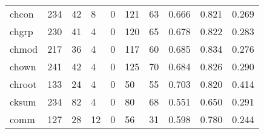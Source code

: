 \begin{longtable}{lp{2.0cm}p{2.0cm}p{2.0cm}p{2.0cm}p{2.0cm}p{2.0cm}p{2.0cm}p{2.0cm}p{2.0cm}}
chcon     &                    234 &                                 42 &                                 8 &                                0 &                               121 &                              63 &                                0.666 &                                  0.821 &                                0.269 \\
chgrp     &                    230 &                                 41 &                                 4 &                                0 &                               120 &                              65 &                                0.678 &                                  0.822 &                                0.283 \\
chmod     &                    217 &                                 36 &                                 4 &                                0 &                               117 &                              60 &                                0.685 &                                  0.834 &                                0.276 \\
chown     &                    241 &                                 42 &                                 4 &                                0 &                               125 &                              70 &                                0.684 &                                  0.826 &                                0.290 \\
chroot    &                    133 &                                 24 &                                 4 &                                0 &                                50 &                              55 &                                0.703 &                                  0.820 &                                0.414 \\
cksum     &                    234 &                                 82 &                                 4 &                                0 &                                80 &                              68 &                                0.551 &                                  0.650 &                                0.291 \\
comm      &                    127 &                                 28 &                                12 &                                0 &                                56 &                              31 &                                0.598 &                                  0.780 &                                0.244 \\

\end{longtable}
